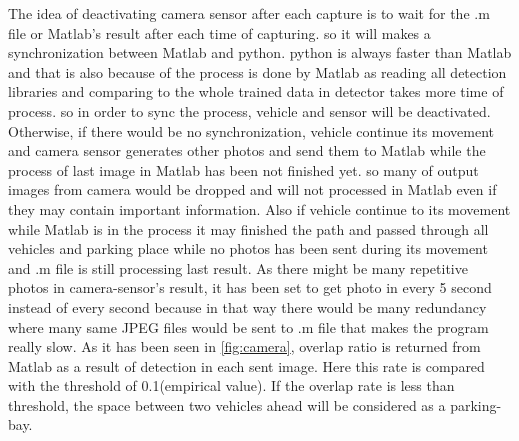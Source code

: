 The idea of deactivating camera sensor after each capture is to wait for the .m file or Matlab's result after each time of capturing. so it will makes a synchronization between Matlab and python. python is always faster than Matlab and that is also because of the process is done by Matlab as reading all detection libraries and comparing to the whole trained data in detector takes more time of process. so in order to sync the process, vehicle and sensor will be deactivated. Otherwise, if there would be no synchronization, vehicle continue its movement and camera sensor generates other photos and send them to Matlab while the process of last image in Matlab has been not finished yet. so many of output images from camera would be dropped and will not processed in Matlab even if they may contain important information. Also if vehicle continue to its movement while  Matlab is in the process it may finished the path and passed through all vehicles and parking place while no photos has been sent during its movement and .m file is still processing last result. As there might be many repetitive photos in camera-sensor's result, it has been set to get photo in every 5 second instead of every second because in that way there would be many redundancy where many same JPEG files would be sent to .m file that makes the program really slow.
As it has been seen in \ref{fig:camera}, overlap ratio is returned from  Matlab as a result of detection in each sent image. Here this rate is compared with the threshold of 0.1(empirical value). If the overlap rate is less than threshold, the space between two vehicles ahead will be considered as a parking-bay. 

